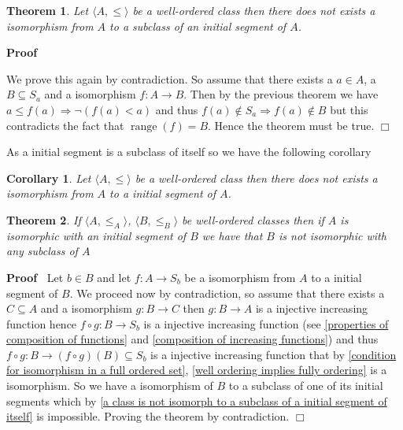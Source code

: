 \documentclass{book}
\newcommand{\nin}{\not\in}
\newcommand{\tmop}[1]{\ensuremath{\operatorname{#1}}}
\newenvironment{proof}{\noindent\textbf{Proof\ }}{\hspace*{\fill}$\Box$\medskip}
\newtheorem{corollary}{Corollary}
\newtheorem{theorem}{Theorem}
\begin{document}
{{\begin{theorem}
  \label{a class is not isomorph to a subclass of a initial segment of
  itself}Let $\langle A, \leqslant \rangle$ be a well-ordered class then there
  does not exists a isomorphism from $A$ to a subclass of an initial segment
  of $A$.
\end{theorem}

\begin{proof}
  
  
  We prove this again by contradiction. So assume that there exists a $a \in
  A$, a $B \subseteq S_a$ and a isomorphism $f : A \rightarrow B$. Then by the
  previous theorem we have $a \leqslant f (a) \Rightarrow \neg (f (a) < a)$
  and thus $f (a) \nin S_a \Rightarrow f (a) \nin B$ but this contradicts the
  fact that $\tmop{range} (f) = B$. Hence the theorem must be true. 
\end{proof}

As a initial segment is a subclass of itself so we have the following
corollary

\begin{corollary}
  \label{in a well-ordered class there is no isomorphism to a initial
  segment}Let $\langle A, \leqslant \rangle$ be a well-ordered class then
  there does not exists a isomorphism from $A$ to a initial segment of $A$.
\end{corollary}

\begin{theorem}
  \label{if A is isomorph with a segment of B then B is not isomorph with a
  sublcass of A}If $\langle A, \leqslant_A \rangle$, $\langle B, \leqslant_B
  \rangle$ be well-ordered classes then if $A$ is isomorphic with an initial
  segment of $B$ we have that $B$ is not isomorphic with any subclass of $A$ 
\end{theorem}

\begin{proof}
  Let $b \in B$ and let $f : A \rightarrow S_b$ be a isomorphism from $A$ to a
  initial segment of $B$. We proceed now by contradiction, so assume that
  there exists a $C \subseteq A$ and a isomorphism $g : B \rightarrow C$ then
  $g : B \rightarrow A$ is a injective increasing function hence $f \circ g :
  B \rightarrow S_b$ is a injective increasing function (see \ref{properties
  of composition of functions} and \ref{composition of increasing functions})
  and thus $f \circ g : B \rightarrow (f \circ g) (B) \subseteq S_b$ is a
  injective increasing function that by \ref{condition for isomorphism in a
  full ordered set}, \ref{well ordering implies fully ordering} is a
  isomorphism. So we have a isomorphism of $B$ to a subclass of one of its
  initial segments which by \ref{a class is not isomorph to a subclass of a
  initial segment of itself} is impossible. Proving the theorem by
  contradiction.
\end{proof}

}}
\end{document}
